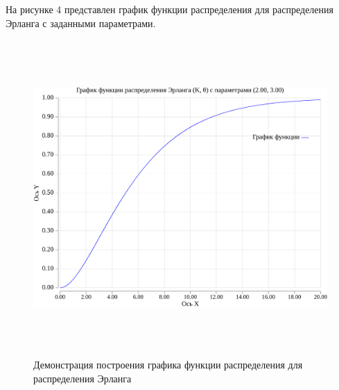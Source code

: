 \newpage

На рисунке 4 представлен график функции распределения для распределения Эрланга с заданными параметрами.
\FloatBarrier
\begin{figure}[h]
	\begin{center}
		\includegraphics[width=\linewidth, height=12cm]{inc/erlangFunc.png}
	\end{center}
	\caption{Демонстрация построения графика функции распределения для распределения Эрланга}
\end{figure}
\FloatBarrier